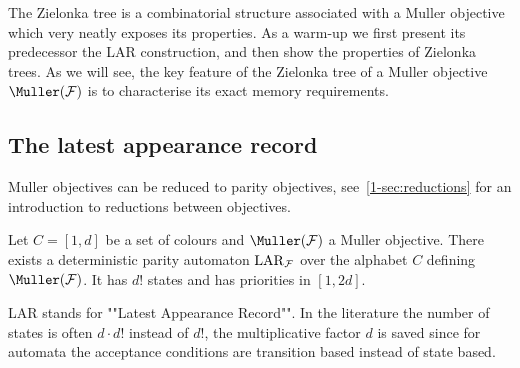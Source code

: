 The Zielonka tree is a combinatorial structure associated with a Muller objective which very neatly exposes its properties.
As a warm-up we first present its predecessor the LAR construction, and then show the properties of Zielonka trees.
As we will see, the key feature of the Zielonka tree of a Muller objective $\Muller(\F)$ is to characterise its exact memory requirements.

\subsection*{The latest appearance record}
Muller objectives can be reduced to parity objectives, see~\cref{1-sec:reductions} for an introduction to reductions between objectives.

\begin{theorem}
\label{2-thm:LAR}
Let $C = [1,d]$ be a set of colours and $\Muller(\F)$ a Muller objective.
There exists a deterministic parity automaton $\mathrm{LAR}_{\mathcal{F}}$ over the alphabet $C$ defining $\Muller(\F)$.
It has $d!$ states and has priorities in $[1,2d]$.
\end{theorem}

LAR stands for ""Latest Appearance Record"".
In the literature the number of states is often $d \cdot d!$ instead of $d!$,
the multiplicative factor $d$ is saved since for automata the acceptance conditions are transition based 
instead of state based.

